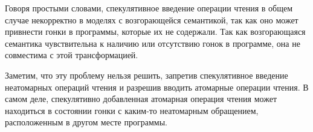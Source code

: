 Говоря простыми словами, спекулятивное введение операции чтения 
в общем случае некорректно в моделях с возгорающейся семантикой,
так как оно может привнести гонки в программы, 
которые их не содержали. 
Так как возгорающаяся семантика чувствительна 
к наличию или отсутствию гонок в программе, 
она не совместима с этой трансформацией. 

Заметим, что эту проблему нельзя решить, 
запретив спекулятивное введение неатомарных операций чтения 
и разрешив вводить атомарные операции чтения. 
В самом деле, спекулятивно добавленная атомарная операция чтения
может находиться в состоянии гонки с каким-то неатомарным обращением, 
расположенным в другом месте программы. 
